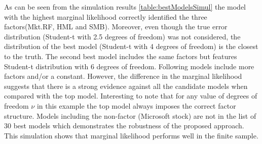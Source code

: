As can be seen from the simulation results \ref{table:bestModelsSimul} the model with the highest marginal likelihood correctly identified the three factors(Mkt.RF, HML and SMB).
Moreover, even though the true error distribution (Student-t with 2.5 degrees of freedom) was not considered, the distribution of the best model (Student-t with 4 degrees of freedom) is the closest to the truth. 
The second best model includes the same factors but features Student-t distribution with 6 degrees of freedom. 
Following models include more factors and/or a constant.
However, the difference in the marginal likelihood suggests that there is a strong evidence against all the candidate models when compared with the top model.
Interesting to note that for any value of degrees of freedom $\nu$ in this example the top model always imposes the correct factor structure. 
Models including the non-factor (Microsoft stock) are not in the list of 30 best models which demonstrates the robustness of the proposed approach.
This simulation shows that marginal likelihood performs well in the finite sample.
